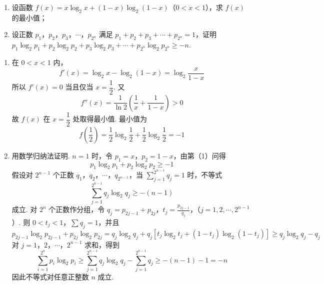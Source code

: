 \begin{problem}
\begin{enumerate}
\item 设函数 \(f(x) = x\log_2 x + (1 - x)\log_2(1 - x)\)（\(0 < x < 1\)），求 \(f(x)\) 的最小值；
\item 设正数 \(p_1\)，\(p_2\)，\(p_3\)，\(\cdots\)，\(p_{2^n}\) 满足 \(p_1 + p_2 + p_3 + \cdots + p_{2^n} = 1\)，证明 \(p_1 \log_2 p_1 + p_2 \log_2 p_2 + p_3 \log_2 p_3 + \cdots + p_{2^n} \log_2 p_{2^n} \geqslant -n\).
\end{enumerate}
\end{problem}

\begin{solution}
\begin{enumerate}
\item 在 \(0<x<1\) 内，
\[
f'(x)=\log_2x-\log_2(1-x)=\log_2\frac{x}{1-x}
\]
所以 \(f'(x)=0\) 当且仅当 \(x=\dfrac{1}{2}\). 又
\[
f''(x)=\frac{1}{\ln2}\left(\frac{1}{x}+\frac{1}{1-x}\right)>0
\]
故 \(f(x)\) 在 \(x=\dfrac{1}{2}\) 处取得最小值. 最小值为
\[
f\left(\frac{1}{2}\right)=\frac{1}{2}\log_2\frac{1}{2}+\frac{1}{2}\log_2\frac{1}{2}=-1
\]
\item 用数学归纳法证明. \(n=1\) 时，令 \(p_1=x\)，\(p_2=1-x\)，由第（1）问得
\[
p_1\log_2p_1+p_2\log_2p_2\geqslant-1
\]
假设对 \(2^{n-1}\) 个正数 \(q_1\)，\(q_2\)，\(\cdots\)，\(q_{2^{n-1}}\)，当 \(\sum_{j=1}^{2^{n-1}}q_j=1\) 时，不等式
\[
\sum_{j=1}^{2^{n-1}}q_j\log_2q_j\geqslant-(n-1)
\]
成立. 对 \(2^n\) 个正数作分组，令
\(q_j=p_{2j-1}+p_{2j}\)，\(t_j=\frac{p_{2j-1}}{q_j}\)，（\(j=1,2,\cdots,2^{n-1}\)）.
则 \(0<t_j<1\)，\(\sum q_j=1\)，并且
\[
p_{2j-1}\log_2p_{2j-1}+p_{2j}\log_2p_{2j}=q_j\log_2q_j+q_j\left[t_j\log_2t_j+(1-t_j)\log_2(1-t_j)\right]\geqslant q_j\log_2q_j-q_j
\]
对 \(j=1\)，\(2\)，\(\cdots\)，\(2^{n-1}\) 求和，得到
\[
\sum_{i=1}^{2^n}p_i\log_2p_i\geqslant\sum_{j=1}^{2^{n-1}}q_j\log_2q_j-\sum_{j=1}^{2^{n-1}}q_j\geqslant-(n-1)-1=-n
\]
因此不等式对任意正整数 \(n\) 成立.
\end{enumerate}
\end{solution}
